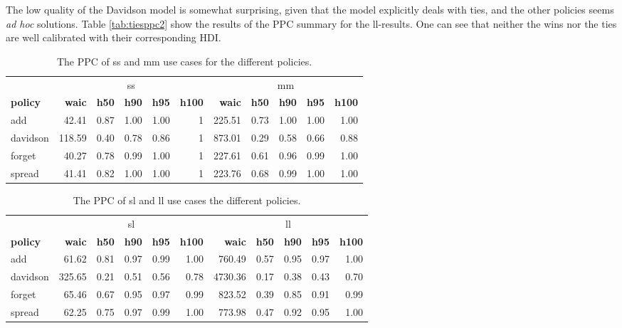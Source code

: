 \documentclass[twoside,11pt,preprint]{article}
\begin{document}
The low quality of the Davidson model is somewhat surprising, given
that the model explicitly deals with ties, and the other policies
seems \emph{ad hoc} solutions. Table \ref{tab:tiesppc2} show the
results of the PPC summary for the ll-results. One can see that
neither the wins nor the ties are well calibrated with their
corresponding HDI.

\begin{table}

\caption{\label{tab:tiesxz1}\label{tab:tiesppc1}The PPC of ss and mm use cases for the different policies.}
\centering
\begin{tabular}[t]{lrrrrrrrrrr}
\toprule
\multicolumn{1}{c}{ } & \multicolumn{5}{c}{ss} & \multicolumn{5}{c}{mm} \\
\cmidrule(l{3pt}r{3pt}){2-6} \cmidrule(l{3pt}r{3pt}){7-11}
\textbf{\textbf{policy}} & \textbf{\textbf{waic}} & \textbf{\textbf{h50}} & \textbf{\textbf{h90}} & \textbf{\textbf{h95}} & \textbf{\textbf{h100}} & \textbf{\textbf{waic}} & \textbf{\textbf{h50}} & \textbf{\textbf{h90}} & \textbf{\textbf{h95}} & \textbf{\textbf{h100}}\\
\midrule
add & 42.41 & 0.87 & 1.00 & 1.00 & 1 & 225.51 & 0.73 & 1.00 & 1.00 & 1.00\\
davidson & 118.59 & 0.40 & 0.78 & 0.86 & 1 & 873.01 & 0.29 & 0.58 & 0.66 & 0.88\\
forget & 40.27 & 0.78 & 0.99 & 1.00 & 1 & 227.61 & 0.61 & 0.96 & 0.99 & 1.00\\
spread & 41.41 & 0.82 & 1.00 & 1.00 & 1 & 223.76 & 0.68 & 0.99 & 1.00 & 1.00\\
\bottomrule
\end{tabular}
\end{table}

\begin{table}

\caption{\label{tab:tiesxz2}\label{tab:tiesppc1b}The PPC of sl and ll use cases the different policies.}
\centering
\begin{tabular}[t]{lrrrrrrrrrr}
\toprule
\multicolumn{1}{c}{ } & \multicolumn{5}{c}{sl} & \multicolumn{5}{c}{ll} \\
\cmidrule(l{3pt}r{3pt}){2-6} \cmidrule(l{3pt}r{3pt}){7-11}
\textbf{\textbf{policy}} & \textbf{\textbf{waic}} & \textbf{\textbf{h50}} & \textbf{\textbf{h90}} & \textbf{\textbf{h95}} & \textbf{\textbf{h100}} & \textbf{\textbf{waic}} & \textbf{\textbf{h50}} & \textbf{\textbf{h90}} & \textbf{\textbf{h95}} & \textbf{\textbf{h100}}\\
\midrule
add & 61.62 & 0.81 & 0.97 & 0.99 & 1.00 & 760.49 & 0.57 & 0.95 & 0.97 & 1.00\\
davidson & 325.65 & 0.21 & 0.51 & 0.56 & 0.78 & 4730.36 & 0.17 & 0.38 & 0.43 & 0.70\\
forget & 65.46 & 0.67 & 0.95 & 0.97 & 0.99 & 823.52 & 0.39 & 0.85 & 0.91 & 0.99\\
spread & 62.25 & 0.75 & 0.97 & 0.99 & 1.00 & 773.98 & 0.47 & 0.92 & 0.95 & 1.00\\
\bottomrule
\end{tabular}
\end{table}
\end{document}
